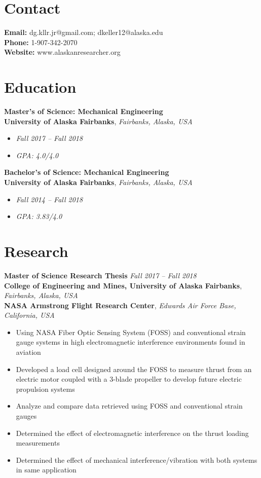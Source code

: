 \documentclass[12pt,a4paper]{article}
\begin{document}
\section*{Contact}

\textbf{Email:} dg.kllr.jr@gmail.com; dkeller12@alaska.edu\\
\textbf{Phone:} 1-907-342-2070\\
\textbf{Website:} www.alaskanresearcher.org

\section*{Education}

\textbf{Master’s of Science: Mechanical Engineering}\\
\textbf{University of Alaska Fairbanks}, \textit{Fairbanks, Alaska, USA}
\begin{itemize}
\item[] \textit{Fall 2017 – Fall 2018}
\item[]\textit{GPA: 4.0/4.0}
\end{itemize}

\textbf{Bachelor’s of Science: Mechanical Engineering}\\
\textbf{University of Alaska Fairbanks}, \textit{Fairbanks, Alaska, USA}
\begin{itemize}
\item[] \textit{Fall 2014 – Fall 2018}
\item[] \textit{GPA: 3.83/4.0}
\end{itemize}


\section*{Research}

\textbf{Master of Science Research Thesis} \textit{Fall 2017 – Fall 2018}\\
\textbf{College of Engineering and Mines, University of Alaska Fairbanks}, \textit{Fairbanks, Alaska, USA}\\
\textbf{NASA Armstrong Flight Research Center}, \textit{Edwards Air Force Base, California, USA}
\begin{itemize}
\item Using NASA Fiber Optic Sensing System (FOSS) and conventional strain gauge systems in high electromagnetic interference environments found in aviation
\item Developed a load cell designed around the FOSS to measure thrust from an electric motor coupled with a 3-blade propeller to develop future electric propulsion systems
\item Analyze and compare data retrieved using FOSS and conventional strain gauges
\item Determined the effect of electromagnetic interference on the thrust loading measurements
\item Determined the effect of mechanical interference/vibration with both systems in same
application
\end{itemize}
\end{document}
